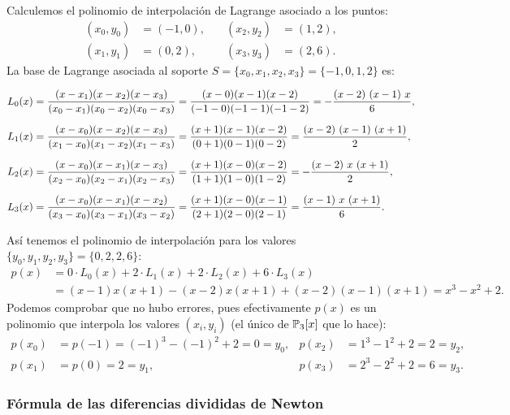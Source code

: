 \begin{example}
  \label{sec:formula-de-lagrange}
  Calculemos el polinomio de interpolación de Lagrange asociado a
  los puntos:
  \begin{align*}
    (x_0, y_0)&=(-1,0), &\quad (x_2, y_2)&=(1,2),\\ 
    (x_1, y_1)&=(0,2),   &\quad (x_3, y_3)&=(2,6).
  \end{align*}
  La base de Lagrange asociada al soporte $S=\{x_0,x_1,x_2,x_3\}=\{-1,0,1,2\}$ es:
  \begin{small}
    \begin{align*}
      L_0(x) & =
      \frac{(x-x_1)(x-x_2)(x-x_3)}{(x_0-x_1)(x_0-x_2)(x_0-x_3)} =
      \frac{(x-0)(x-1)(x-2)}{(-1-0)(-1-1)(-1-2)} =
      -{{\left(x-2\right)\,\left(x-1\right)\,x}\over{6}}, \\
      \noalign{\medskip} L_1(x) & =
      \frac{(x-x_0)(x-x_2)(x-x_3)}{(x_1-x_0)(x_1-x_2)(x_1-x_3)} =
      \frac{(x+1)(x-1)(x-2)}{(0+1)(0-1)(0-2)} =
      {{\left(x-2\right)\,\left(x-1\right)\,\left(x+1\right)}\over{2}},
      \\ \noalign{\medskip} L_2(x) & =
      \frac{(x-x_0)(x-x_1)(x-x_3)}{(x_2-x_0)(x_2-x_1)(x_2-x_3)} =
      \frac{(x+1)(x-0)(x-2)}{(1+1)(1-0)(1-2)} =
      -{{\left(x-2\right)\,x\,\left(x+1\right)}\over{2}}, \\
      \noalign{\medskip} L_3(x) & =
      \frac{(x-x_0)(x-x_1)(x-x_2)}{(x_3-x_0)(x_3-x_1)(x_3-x_2)} =
      \frac{(x+1)(x-0)(x-1)}{(2+1)(2-0)(2-1)} =
      {{\left(x-1\right)\,x\,\left(x+1\right)}\over{6}}.
    \end{align*}
  \end{small} 
  Así tenemos el polinomio de interpolación para los valores
  $\{y_0,y_1,y_2,y_3\}=\{0,2,2,6\}$:
  \begin{align*}
    p(x)&= 0\cdot L_0(x) + 2\cdot L_1(x)+ 2\cdot L_2(x)+6\cdot L_3(x)
    \\ &=(x-1)x(x+1)-(x-2)x(x+1)+(x-2)(x-1)(x+1)
    =x^3-x^2+2.
  \end{align*}
  Podemos comprobar que no hubo errores, pues efectivamente $p(x)$ es
  un polinomio que interpola los valores
  $(x_i,y_i)$ (el único de $\operatorname{{\mathbb P}}_3[x]$ que lo hace):
  \begin{align*}
    p(x_0)&=p(-1)=(-1)^3-(-1)^2+2=0=y_0, & p(x_2)&=1^3-1^2+2 = 2=y_2, \\
    p(x_1)&=p(0) = 2=y_1, & p(x_3)&=2^3-2^2+2 = 6=y_3.
  \end{align*}
\end{example}
  
\subsubsection{Fórmula de las diferencias divididas de Newton}
\label{sec:formula-de-newton}


